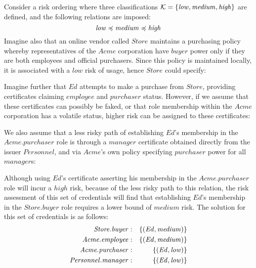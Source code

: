 Consider a risk ordering where three classifications $\mathcal{K} =
\setdefn{\mathit{low,medium,high}}$ are defined, and the following
relations are imposed:
$$
\mathit{low} \po \mathit{medium} \po \mathit{high}
$$ 
Imagine also that an online vendor called $\mathit{Store}$
maintains a purchasing policy whereby representatives of the
$\mathit{Acme}$ corporation have $\mathit{buyer}$ power only if they
are both employees and official purchasers.  Since this policy is
maintained locally, it is associated with a $\mathit{low}$ risk of
usage, hence $\mathit{Store}$ could specify:
\begin{mathpar}
\end{mathpar}
Imagine further that $\mathit{Ed}$ attempts to make a purchase from
$\mathit{Store}$, providing certificates claiming $\mathit{employee}$
and $\mathit{purchaser}$ status.  However, if we assume that these
certificates can possibly be faked, or that role membership within the
$\mathit{Acme}$ corporation has a volatile status, higher risk can be
assigned to these certificates:
\begin{mathpar}

\end{mathpar}
We also assume that a less risky path of establishing $\mathit{Ed}$'s
membership in the $\mathit{Acme.purchaser}$ role is through a
$\mathit{manager}$ certificate obtained directly from the issuer
$\mathit{Personnel}$, and via $\mathit{Acme}$'s own policy
specifying $\mathit{purchaser}$ power for all $\mathit{manager}$s:
\begin{mathpar}

\end{mathpar}
Although using $\mathit{Ed}$'s certificate asserting his membership in
the $\mathit{Acme.purchaser}$ role will incur a $\mathit{high}$ risk,
because of the less risky path to this relation, the risk assessment of
this set of credentials will find that establishing $\mathit{Ed}$'s
membership in the $\mathit{Store.buyer}$ role requires a lower bound of
$\mathit{medium}$ risk.  The solution for this set of credentials 
is as follows:
\begin{eqnarray*}
\mathit{Store.buyer}&:& \setdefn{(\mathit{Ed, medium})}\\
\mathit{Acme.employee}&:& \setdefn{(\mathit{Ed, medium})}\\
\mathit{Acme.purchaser}&:& \setdefn{(\mathit{Ed, low})}\\
\mathit{Personnel.manager}&:& \setdefn{(\mathit{Ed, low})}
\end{eqnarray*}
